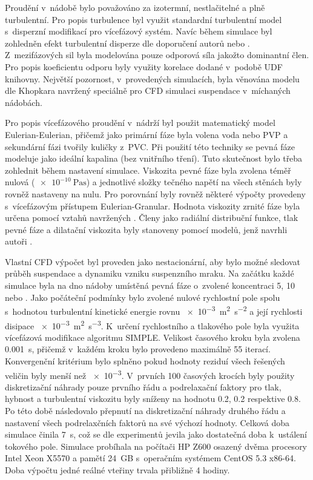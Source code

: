 Proudění v~nádobě bylo považováno za izotermní, nestlačitelné a plně turbulentní. Pro popis turbulence byl využit standardní \keps{} turbulentní model s~disperzní modifikací pro vícefázový systém. Navíc během simulace byl zohledněn efekt turbulentní disperze dle doporučení autorů \citet{lju01} nebo \citet{tamb09}. Z~mezifázových sil byla modelována pouze odporová síla jakožto dominantní člen. Pro popis koeficientu odporu byly využity korelace dodané v~podobě UDF knihovny. Největší pozornost, v~provedených simulacích, byla věnována modelu dle Khopkara navržený speciálně pro CFD simulaci suspendace v~míchaných nádobách.

Pro popis vícefázového proudění v~nádrží byl použit matematický model Eulerian-Eulerian, přičemž jako primární fáze byla volena voda nebo PVP a sekundární fázi tvořily kuličky z~PVC. Při použití této techniky se pevná fáze modeluje jako ideální kapalina (bez vnitřního tření). Tuto skutečnost bylo třeba zohlednit během nastavení simulace. Viskozita pevné fáze byla zvolena téměř nulová ($\SI{e-10}{\pascal\second}$) a jednotlivé složky tečného napětí na všech stěnách byly rovněž nastaveny na nulu. Pro porovnání byly rovněž některé výpočty provedeny s~vícefázovým přístupem Eulerian-Granular. Hodnota viskozity zrnité fáze byla určena pomocí vztahů navržených \citet{syam93}. Členy jako radiální distribuční funkce, tlak pevné fáze a dilatační viskozita byly stanoveny pomocí modelů, jenž navrhli autoři \citet{lun84}.  

Vlastní CFD výpočet byl proveden jako nestacionární, aby bylo možné sledovat průběh suspendace a dynamiku vzniku suspenzního mraku. Na začátku každé simulace byla na dno nádoby umístěná pevná fáze o~zvolené koncentraci 5, 10 nebo . Jako počáteční podmínky bylo zvolené nulové rychlostní pole spolu s~hodnotou turbulentní kinetické energie rovnu \SI{e-3}{\meter\squared\per\second\squared} a její rychlosti disipace \SI{e-3}{\meter\squared\per\second\cubed}. K~určení rychlostního a tlakového pole byla využita vícefázová modifikace algoritmu SIMPLE. Velikost časového kroku byla zvolena \SI{0.001}{\second}, přičemž v~každém kroku bylo provedeno maximálně \num{55} iterací. Konvergenční kritérium bylo splněno pokud hodnoty reziduí všech řešených veličin byly menší než \num{e-3}. V~prvních \num{100} časových krocích byly použity diskretizační náhrady pouze prvního řádu a podrelaxační faktory pro tlak, hybnost a turbulentní viskozitu byly sníženy na hodnotu \num{0.2}, \num{0.2} respektive \num{0.8}. Po této době následovalo přepnutí na diskretizační náhrady druhého řádu a nastavení všech podrelaxčních faktorů na své výchozí hodnoty. Celková doba simulace činila \SI{7}{\second}, což se dle experimentů jevila jako dostatečná doba k~ustálení tokového pole. Simulace probíhala na počítači HP Z600 osazený dvěma procesory Intel Xeon X5570 a pamětí 24~GB s~operačním systémem CentOS 5.3 x86-64. Doba výpočtu jedné reálné vteřiny trvala přibližně 4 hodiny.


